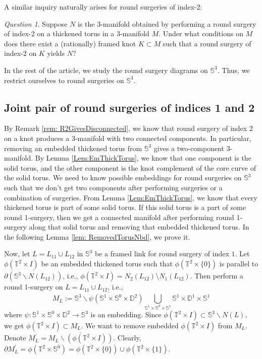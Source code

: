 \documentclass{amsart}
\theoremstyle{plain}
\theoremstyle{remark}
\newtheorem{ques}{Question}
\theoremstyle{definition}
\newcommand{\s}{\mathbb{S}}
\newcommand{\D}{\mathbb{D}}
\begin{document}
A similar inquiry naturally arises for round surgeries of index-2:

\begin{ques}
    Suppose $N$ is the 3-manifold obtained by performing a round surgery of index-2 on a thickened torus in a 3-manifold $M$. Under what conditions on $M$ does there exist a (rationally) framed knot $K \subset M$ such that a round surgery of index-2 on $K$ yields $N$?   
\end{ques}

In the rest of the article, we study the round surgery diagrams on $\s^3$. Thus, we restrict ourselves to round surgeries on $\s^3$.  

\subsection{Joint pair of round surgeries of indices 1 and 2}\label{subsec: Joint pair}
By Remark \ref{rem: R2GivesDisconnected}, we know that round surgery of index 2 on a knot produces a 3-manifold with two connected components. 
In particular, removing an embedded thickened torus from $\s^3$ gives a two-component 3-manifold. 
By Lemma \ref{Lem:EmThickTorus}, we know that one component is the solid torus, and the other component is the knot complement of the core curve of the solid torus.   
We need to know possible embeddings for round surgeries on $\s^3$ such that we don't get two components after performing surgeries or a combination of surgeries. 
From Lemma \ref{Lem:EmThickTorus}, we know that every thickened torus is part of some solid torus.
If this solid torus is a part of some round 1-surgery, then we get a connected manifold after performing round 1-surgery along that solid torus and removing that embedded thickened torus. 
In the following Lemma \ref{lem: RemovedTorusNbd}, we prove it. 

Now, let $L=L_{11} \cup L_{12}$ in $\s^3$ be a framed link for round surgery of index $1$. Let $\phi(\mathbb{T}^{2} \times I) $ be an embedded thickened torus such that $\phi(\mathbb{T}^{2} \times\{0\})$ is parallel to $\overline{\partial\left(\s^{3} \backslash N\left(L_{12}\right)\right)}$, i.e., $\phi(\mathbb{T}^2 \times I)= N_2(L_{12}) \setminus N_1(L_{12})$. Then perform a round 1-surgery on $L=L_{11} \cup L_{12}$, i.e.,
$$
M_{L}:=\overline{\s^{3} \backslash \psi\left(\s^{1} \times \s^{0} \times \D^{2}\right)} \bigcup_{\s^{1} \times \s^{0} \times \s^{1}} \s^1 \times \D^{1} \times \s^{1}
$$
where $\psi : \s^1 \times \s^0 \times \D^2 \to \s^3$ is an embedding. 
Since $\phi(\mathbb{T}^{2} \times I) \subset \s^{3} \backslash N(L),$ we get $\phi(\mathbb{T}^{2} \times I )\subset M_{L}$. 
We want to remove embedded $\phi(\mathbb{T}^{2} \times I)$ from $M_{L}$. 
Denote $M_{L}^{\prime}=\overline{M_{L} \backslash\left(\phi(\mathbb{T}^{2} \times I)\right)}$.
Clearly, $\partial M_{L}^{\prime}=\phi(\mathbb{T}^2 \times \s^0) =\phi(\mathbb{T}^{2} \times \{0\}) \cup \phi(\mathbb{T}^{2} \times \{1\})$.
\end{document}
